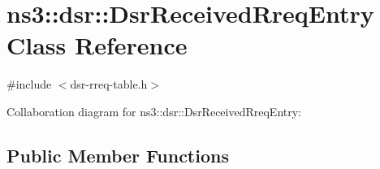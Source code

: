 \hypertarget{classns3_1_1dsr_1_1DsrReceivedRreqEntry}{}\section{ns3\+:\+:dsr\+:\+:Dsr\+Received\+Rreq\+Entry Class Reference}
\label{classns3_1_1dsr_1_1DsrReceivedRreqEntry}


{\ttfamily \#include $<$dsr-\/rreq-\/table.\+h$>$}



Collaboration diagram for ns3\+:\+:dsr\+:\+:Dsr\+Received\+Rreq\+Entry\+:
\subsection*{Public Member Functions}
